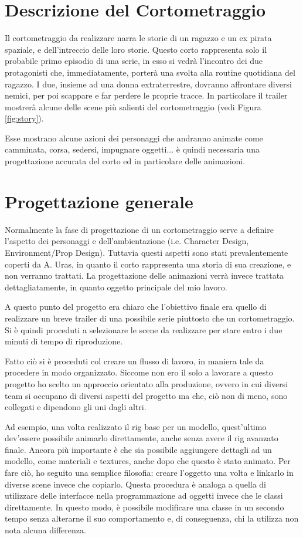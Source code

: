 \section{Descrizione del Cortometraggio}

Il cortometraggio da realizzare narra le storie di un ragazzo e un ex pirata spaziale, e dell'intreccio delle loro storie.
Questo corto rappresenta solo il probabile primo episodio di una serie, in esso si vedrà l'incontro dei due protagonisti che, immediatamente, porterà una svolta alla routine quotidiana del ragazzo.
I due, insieme ad una donna extraterrestre, dovranno affrontare diversi nemici, per poi scappare e far perdere le proprie tracce.
In particolare il trailer mostrerà alcune delle scene più salienti del cortometraggio (vedi Figura \ref{fig:story}).


Esse mostrano alcune azioni dei personaggi che andranno animate come camminata, corsa, sedersi, impugnare oggetti... è quindi necessaria una progettazione accurata del corto ed in particolare delle animazioni.

\section{Progettazione generale}

Normalmente la fase di progettazione di un cortometraggio serve a definire l'aspetto dei personaggi e dell'ambientazione (i.e. Character Design, Environment/Prop Design).
Tuttavia questi aspetti sono stati prevalentemente coperti da A. Uras, in quanto il corto rappresenta una storia di sua creazione, e non verranno trattati. La progettazione delle animazioni verrà invece trattata dettagliatamente, in quanto oggetto principale del mio lavoro.

A questo punto del progetto era chiaro che l'obiettivo finale era quello di realizzare un breve trailer di una possibile serie piuttosto che un cortometraggio.
Si è quindi proceduti a selezionare le scene da realizzare per stare entro i due minuti di tempo di riproduzione.

Fatto ciò si è proceduti col creare un flusso di lavoro, in maniera tale da procedere in modo organizzato.
Siccome non ero il solo a lavorare a questo progetto ho scelto un approccio orientato alla produzione, ovvero in cui diversi team si occupano di diversi aspetti del progetto ma che, ciò non di meno, sono collegati e dipendono gli uni dagli altri.

Ad esempio, una volta realizzato il rig base per un modello, quest'ultimo dev'essere possibile animarlo direttamente, anche senza avere il rig avanzato finale. Ancora più importante è che sia possibile aggiungere dettagli ad un modello, come materiali e textures, anche dopo che questo è stato animato.
Per fare ciò, ho seguito una semplice filosofia: creare l'oggetto una volta e linkarlo in diverse scene invece che copiarlo.
Questa procedura è analoga a quella di utilizzare delle interfacce nella programmazione ad oggetti invece che le classi direttamente. In questo modo, è possibile modificare una classe in un secondo tempo senza alterarne il suo comportamento e, di conseguenza, chi la utilizza non nota alcuna differenza.


